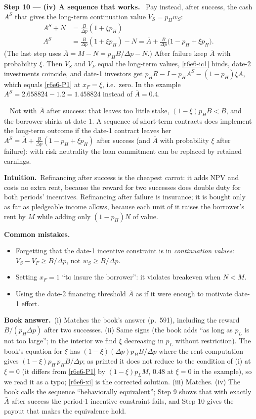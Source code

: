 \documentclass[11pt,a4paper]{article}
\newcommand{\step}[2]{\par\medskip\noindent\textbf{Step #1 --- #2.}~}
\newcommand{\intuition}{\par\medskip\noindent\textbf{Intuition.}~}
\newcommand{\bookans}{\par\medskip\noindent\textbf{Book answer.}~}
\newcommand{\answer}[1]{\par\smallskip\noindent\fbox{\textbf{Answer #1.}}~}
\newcommand{\pitfalls}{\par\medskip\noindent\textbf{Common mistakes.}}
\begin{document}
\step{10}{(iv) A sequence that works} Pay instead, after success, the cash $A^S$ that gives the long-term continuation value $V_S=p_Hw_S$:
\begin{align}
  A^S+N &= \frac{B}{\Delta p}(1+\xi p_H) \nonumber\\
  A^S &= \frac{B}{\Delta p}(1+\xi p_H)-N = \bar A+\frac{B}{\Delta p}\big(1-p_H+\xi p_H\big). \label{r6e6-AS}
\end{align}
(The last step uses $\bar A=M-N=p_HB/\Delta p-N$.) After failure keep $\bar A$ with probability $\xi$. Then $V_S$ and $V_F$ equal the long-term values, \eqref{r6e6-ic1} binds, date-2 investments coincide, and date-1 investors get $p_HR-I-p_HA^S-(1-p_H)\xi\bar A$, which equals \eqref{r6e6-P1} at $x_F=\xi$, i.e.\ zero. In the example $A^S=2.658824-1.2=1.458824$ instead of $\bar A=0.4$.

\answer{(iv)} Not with $\bar A$ after success: that leaves too little stake, $(1-\xi)p_HB<B$, and the borrower shirks at date 1. A sequence of short-term contracts does implement the long-term outcome if the date-1 contract leaves her $A^S=\bar A+\frac{B}{\Delta p}(1-p_H+\xi p_H)$ after success (and $\bar A$ with probability $\xi$ after failure): with risk neutrality the loan commitment can be replaced by retained earnings.

\intuition Refinancing after success is the cheapest carrot: it adds NPV and costs no extra rent, because the reward for two successes does double duty for both periods' incentives. Refinancing after failure is insurance; it is bought only as far as pledgeable income allows, because each unit of it raises the borrower's rent by $M$ while adding only $(1-p_H)N$ of value.

\pitfalls
\begin{itemize}
  \item Forgetting that the date-1 incentive constraint is in \emph{continuation values}: $V_S-V_F\ge B/\Delta p$, not $w_S\ge B/\Delta p$.
  \item Setting $x_F=1$ ``to insure the borrower'': it violates breakeven when $N<M$.
  \item Using the date-2 financing threshold $\bar A$ as if it were enough to motivate date-1 effort.
\end{itemize}

\bookans (i) Matches the book's answer (p.~591), including the reward $B/(p_H\Delta p)$ after two successes. (ii) Same signs (the book adds ``as long as $p_L$ is not too large''; in the interior we find $\xi$ decreasing in $p_L$ without restriction). The book's equation for $\xi$ has $(1-\xi)(\Delta p)p_HB/\Delta p$ where the rent computation gives $(1-\xi)p_H\,p_HB/\Delta p$; as printed it does not reduce to the condition of (i) at $\xi=0$ (it differs from \eqref{r6e6-P1} by $(1-\xi)p_LM$, 0.48 at $\xi=0$ in the example), so we read it as a typo; \eqref{r6e6-xi} is the corrected solution. (iii) Matches. (iv) The book calls the sequence ``behaviorally equivalent''; Step 9 shows that with exactly $\bar A$ after success the period-1 incentive constraint fails, and Step 10 gives the payout that makes the equivalence hold.
\end{document}
